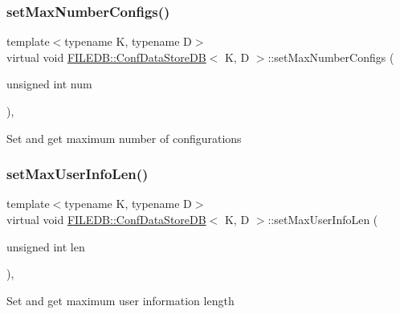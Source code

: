 \subsubsection{\texorpdfstring{setMaxNumberConfigs()}{setMaxNumberConfigs()}\hspace{0.1cm}{\footnotesize\ttfamily [3/3]}}
{\footnotesize\ttfamily template$<$typename K, typename D$>$ \\
virtual void \mbox{\hyperlink{classFILEDB_1_1ConfDataStoreDB}{F\+I\+L\+E\+D\+B\+::\+Conf\+Data\+Store\+DB}}$<$ K, D $>$\+::set\+Max\+Number\+Configs (\begin{DoxyParamCaption}\item[{unsigned int}]{num }\end{DoxyParamCaption})\hspace{0.3cm}{\ttfamily [inline]}, {\ttfamily [virtual]}}

Set and get maximum number of configurations \mbox{\label{classFILEDB_1_1ConfDataStoreDB_a02a2fcc79ba97c11b4ec1ec0321e5415}} 
\subsubsection{\texorpdfstring{setMaxUserInfoLen()}{setMaxUserInfoLen()}\hspace{0.1cm}{\footnotesize\ttfamily [1/3]}}
{\footnotesize\ttfamily template$<$typename K, typename D$>$ \\
virtual void \mbox{\hyperlink{classFILEDB_1_1ConfDataStoreDB}{F\+I\+L\+E\+D\+B\+::\+Conf\+Data\+Store\+DB}}$<$ K, D $>$\+::set\+Max\+User\+Info\+Len (\begin{DoxyParamCaption}\item[{unsigned int}]{len }\end{DoxyParamCaption})\hspace{0.3cm}{\ttfamily [inline]}, {\ttfamily [virtual]}}

Set and get maximum user information length \mbox{\label{classFILEDB_1_1ConfDataStoreDB_a02a2fcc79ba97c11b4ec1ec0321e5415}} 
